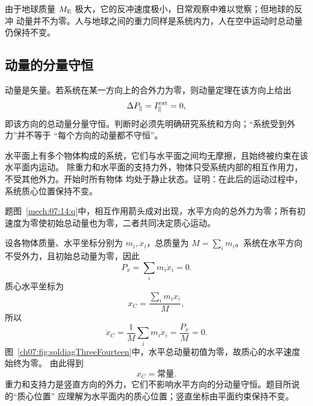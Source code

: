 {\begin{xesolution}
\soldiagThreeThirteen
由于地球质量 $M_{\rm E}$ 极大，它的反冲速度极小，日常观察中难以觉察；但地球的反冲
动量并不为零。人与地球之间的重力同样是系统内力，人在空中运动时总动量仍保持不变。
\end{xesolution}

\subsection{动量的分量守恒}

动量是矢量。若系统在某一方向上的合外力为零，则动量定理在该方向上给出
\[
 \Delta P_{\parallel}=I_{\parallel}^{\rm ext}=0,
\]
即该方向的总动量分量守恒。判断时必须先明确研究系统和方向；“系统受到外力”并不等于
“每个方向的动量都不守恒”。




\begin{origexamplebox}{}\label{ch07:ex:s08-3-14}
水平面上有多个物体构成的系统，它们与水平面之间均无摩擦，且始终被约束在该水平面内运动。
除重力和水平面的支持力外，物体只受系统内部的相互作用力，不受其他外力。开始时所有物体
均处于静止状态。证明：在此后的运动过程中，系统质心位置保持不变。

\begin{qualityfigure}
\label{mech:07:14:q}
\end{qualityfigure}
\end{origexamplebox}

\begin{xesolution}题图~\ref{mech:07:14:q}中，相互作用箭头成对出现，水平方向的总外力为零；所有初速度为零使初始总动量也为零，二者共同决定质心运动。

设各物体质量、水平坐标分别为 $m_i,x_i$，总质量为 $M=\sum_i m_i$。系统在水平方向
不受外力，且初始总动量为零，因此
\[
 P_x=\sum_i m_i\dot x_i=0.
\]
质心水平坐标为
\[
 x_C=\frac{\sum_i m_ix_i}{M},
\]
所以
\[
 \dot x_C=\frac{1}{M}\sum_i m_i\dot x_i
 =\frac{P_x}{M}=0.
\]
图~\ref{ch07:fig:soldiagThreeFourteen}中，水平总动量初值为零，故质心的水平速度始终为零。
\soldiagThreeFourteen
由此得到
\[
 \boxed{x_C=\text{常量}}.
\]
重力和支持力是竖直方向的外力，它们不影响水平方向的分动量守恒。题目所说的“质心位置”
应理解为水平面内的质心位置；竖直坐标由平面约束保持不变。
\end{xesolution}

}
